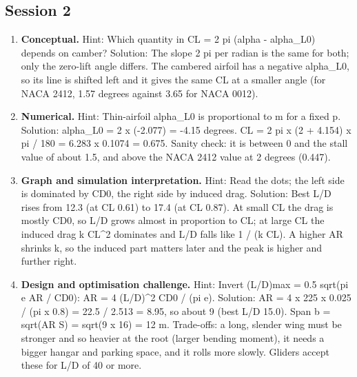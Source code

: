 \documentclass[11pt,a4paper]{article}
\begin{document}
\subsection*{Session 2}
\begin{enumerate}[nosep]
\item \textbf{Conceptual.} Hint: Which quantity in CL = 2 pi (alpha - alpha\_L0) depends on camber? Solution: The slope 2 pi per radian is the same for both; only the zero-lift angle differs. The cambered airfoil has a negative alpha\_L0, so its line is shifted left and it gives the same CL at a smaller angle (for NACA 2412, 1.57 degrees against 3.65 for NACA 0012).
\item \textbf{Numerical.} Hint: Thin-airfoil alpha\_L0 is proportional to m for a fixed p. Solution: alpha\_L0 = 2 x (-2.077) = -4.15 degrees. CL = 2 pi x (2 + 4.154) x pi / 180 = 6.283 x 0.1074 = 0.675. Sanity check: it is between 0 and the stall value of about 1.5, and above the NACA 2412 value at 2 degrees (0.447).
\item \textbf{Graph and simulation interpretation.} Hint: Read the dots; the left side is dominated by CD0, the right side by induced drag. Solution: Best L/D rises from 12.3 (at CL 0.61) to 17.4 (at CL 0.87). At small CL the drag is mostly CD0, so L/D grows almost in proportion to CL; at large CL the induced drag k CL\textasciicircum{}2 dominates and L/D falls like 1 / (k CL). A higher AR shrinks k, so the induced part matters later and the peak is higher and further right.
\item \textbf{Design and optimisation challenge.} Hint: Invert (L/D)max = 0.5 sqrt(pi e AR / CD0): AR = 4 (L/D)\textasciicircum{}2 CD0 / (pi e). Solution: AR = 4 x 225 x 0.025 / (pi x 0.8) = 22.5 / 2.513 = 8.95, so about 9 (best L/D 15.0). Span b = sqrt(AR S) = sqrt(9 x 16) = 12 m. Trade-offs: a long, slender wing must be stronger and so heavier at the root (larger bending moment), it needs a bigger hangar and parking space, and it rolls more slowly. Gliders accept these for L/D of 40 or more.
\end{enumerate}
\end{document}
